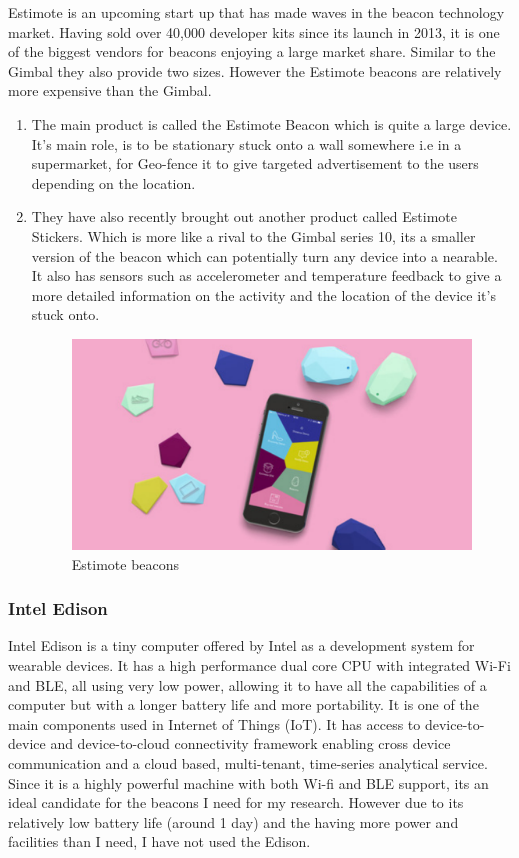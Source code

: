 Estimote\cite{estimote} is an upcoming start up that has made waves
in the beacon technology market. Having sold over 40,000 developer
kits since its launch in 2013, it is one of the biggest vendors for
beacons enjoying a large market share. Similar to the Gimbal they
also provide two sizes. However the Estimote beacons are relatively
more expensive than the Gimbal.
\begin{enumerate}
\item The main product is called the Estimote Beacon which is quite a large
device. It's main role, is to be stationary stuck onto a wall somewhere
i.e in a supermarket, for Geo-fence it to give targeted advertisement
to the users depending on the location.  
\item They have also recently brought out another product called Estimote
Stickers. Which is more like a rival to the Gimbal series 10, its
a smaller version of the beacon which can potentially turn any device
into a nearable. It also has sensors such as accelerometer and
temperature feedback to give a more detailed information on the activity and
the location of the device it's stuck onto.
\begin{figure}[H]
\includegraphics[scale=0.3]{images/estimote}

\protect\caption{Estimote beacons}


\end{figure}

\end{enumerate}

\subsubsection{Intel Edison}

Intel Edison\cite{intel-edision} is a tiny computer offered by Intel
as a development system for wearable devices. It has a high performance
dual core CPU with integrated Wi-Fi and BLE, all using very low power, allowing it to have all the capabilities of a computer but with a longer battery
life and more portability. It is one of the main components used in
Internet of Things (IoT). It has access to device-to-device and device-to-cloud
connectivity framework enabling cross device communication and a
cloud based, multi-tenant, time-series analytical service\cite{intel-edison}. Since it
is a highly powerful machine with both Wi-fi and BLE support, its
an ideal candidate for the beacons I need for my research. However
due to its relatively low battery life (around 1 day) and the having
more power and facilities than I need, I have not used the Edison.


